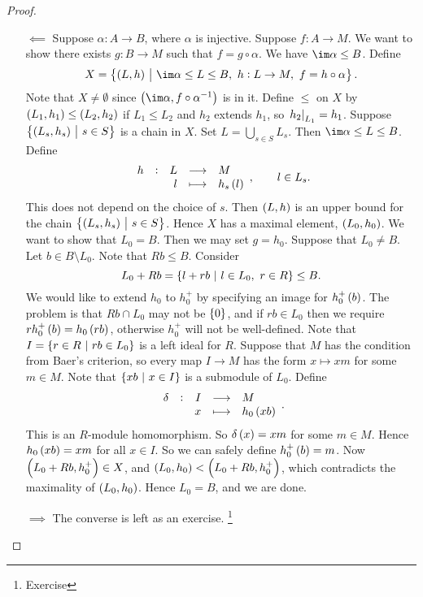 \begin{proof}
\hfill
\begin{itemize}
\item[$ \impliedby $] Suppose $ \alpha : A \to B $, where $ \alpha $ is injective. Suppose $ f : A \to M $. We want to show there exists $ g : B \to M $ such that $ f = g \circ \alpha $. We have $ \im \alpha \le B $. Define
$$ X = \cbr{\br{L, h} \st \im \alpha \le L \le B, \ h : L \to M, \ f = h \circ \alpha}. $$
Note that $ X \ne \emptyset $ since $ \br{\im \alpha, f \circ \alpha^{-1}} $ is in it. Define $ \le $ on $ X $ by $ \br{L_1, h_1} \le \br{L_2, h_2} $ if $ L_1 \le L_2 $ and $ h_2 $ extends $ h_1 $, so $ \left. h_2 \right|_{L_1} = h_1 $. Suppose $ \cbr{\br{L_s, h_s} \st s \in S} $ is a chain in $ X $. Set $ L = \bigcup_{s \in S} L_s $. Then $ \im \alpha \le L \le B $. Define
$$ \function[h]{L}{M}{l}{h_s\br{l}}, \qquad l \in L_s. $$
This does not depend on the choice of $ s $. Then $ \br{L, h} $ is an upper bound for the chain $ \cbr{\br{L_s, h_s} \st s \in S} $. Hence $ X $ has a maximal element, $ \br{L_0, h_0} $. We want to show that $ L_0 = B $. Then we may set $ g = h_0 $. Suppose that $ L_0 \ne B $. Let $ b \in B \setminus L_0 $. Note that $ Rb \le B $. Consider
$$ L_0 + Rb = \cbr{l + rb \st l \in L_0, \ r \in R} \le B. $$
We would like to extend $ h_0 $ to $ h_0^+ $ by specifying an image for $ h_0^+\br{b} $. The problem is that $ Rb \cap L_0 $ may not be $ \cbr{0} $, and if $ rb \in L_0 $ then we require $ rh_0^+\br{b} = h_0\br{rb} $, otherwise $ h_0^+ $ will not be well-defined. Note that $ I = \cbr{r \in R \st rb \in L_0} $ is a left ideal for $ R $. Suppose that $ M $ has the condition from Baer's criterion, so every map $ I \to M $ has the form $ x \mapsto xm $ for some $ m \in M $. Note that $ \cbr{xb \st x \in I} $ is a submodule of $ L_0 $. Define
$$ \function[\delta]{I}{M}{x}{h_0\br{xb}}. $$
This is an $ R $-module homomorphism. So $ \delta\br{x} = xm $ for some $ m \in M $. Hence $ h_0\br{xb} = xm $ for all $ x \in I $. So we can safely define $ h_0^+\br{b} = m $. Now $ \br{L_0 + Rb, h_0^+} \in X $, and $ \br{L_0, h_0} < \br{L_0 + Rb, h_0^+} $, which contradicts the maximality of $ \br{L_0, h_0} $. Hence $ L_0 = B $, and we are done.
\item[$ \implies $] The converse is left as an exercise. \footnote{Exercise}
\end{itemize}
\end{proof}

